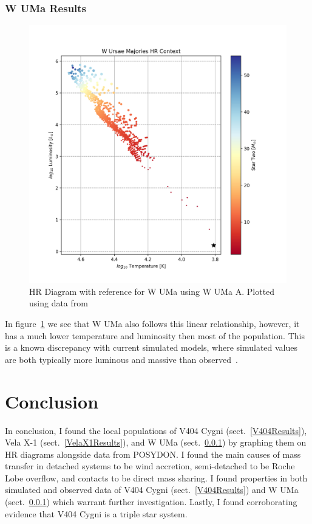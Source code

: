 \documentclass[12pt, a4paper]{article}
\begin{document}
        \subsubsection{W UMa Results} \label{WUMaResults}
            \begin{figure}[H]
                \centering
                \includegraphics[scale = .6]{figs/GeneratedFigs/W_UMa/WUMaHRDiagram.png}
                \caption{HR Diagram with reference for W UMa using W UMa A. Plotted using data from}
                \label{fig:WUMaHRDiagramPOSYDONComp}
            \end{figure}

            In figure~\ref{fig:WUMaHRDiagramPOSYDONComp} we see that W UMa also follows this linear relationship, however, it has a much lower temperature and luminosity then most of the population. This is a known discrepancy with current simulated models, where simulated values are both typically more luminous and massive than observed~\parencite{Fabry_2025}.

\section{Conclusion}
    In conclusion, I found the local populations of V404 Cygni (sect.~\ref{V404Results}), Vela X-1 (sect.~\ref{VelaX1Results}), and W UMa (sect.~\ref{WUMaResults}) by graphing them on HR diagrams alongside data from POSYDON. I found the main causes of mass transfer in detached systems to be wind accretion, semi-detached to be Roche Lobe overflow, and contacts to be direct mass sharing. I found properties in both simulated and observed data of V404 Cygni (sect.~\ref{V404Results}) and W UMa (sect.~\ref{WUMaResults}) which warrant further investigation. Lastly, I found corroborating evidence that V404 Cygni is a triple star system.
\end{document}
